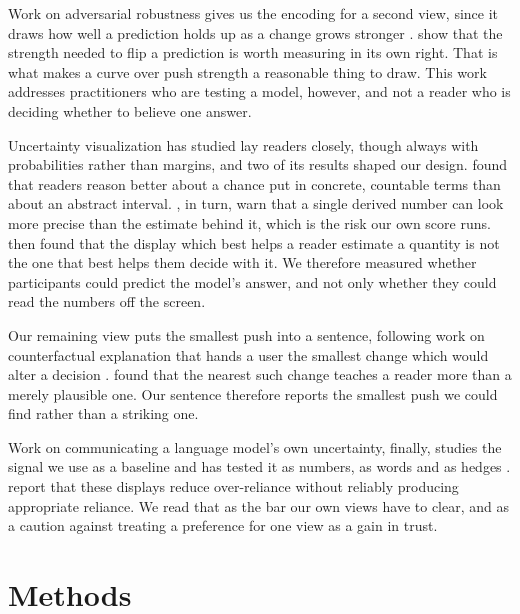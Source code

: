 \documentclass[sigconf]{acmart}
\begin{document}
Work on adversarial robustness gives us the encoding for a second view, since it draws how well a prediction
holds up as a change grows stronger \cite{dasBluffInteractivelyDeciphering2020, youPandaNotPanda2023,
liVisualAnalyticsNeuron2023}. \citet{stoehrActivationScalingSteering2024} show that the strength needed to
flip a prediction is worth measuring in its own right. That is what makes a curve over push strength a
reasonable thing to draw. This work addresses practitioners who are testing a model, however, and not a reader
who is deciding whether to believe one answer.

Uncertainty visualization has studied lay readers closely, though always with probabilities rather than
margins, and two of its results shaped our design. \citet{kayWhenIshMy2016} found that readers reason better
about a chance put in concrete, countable terms than about an abstract interval.
\citet{correllValueSuppressingUncertaintyPalettes2018}, in turn, warn that a single derived number can look
more precise than the estimate behind it, which is the risk our own score runs.
\citet{fernandesUncertaintyDisplaysUsing2018} then found that the display which best helps a reader estimate a
quantity is not the one that best helps them decide with it. We therefore measured whether participants could
predict the model's answer, and not only whether they could read the numbers off the screen.

Our remaining view puts the smallest push into a sentence, following work on counterfactual explanation that
hands a user the smallest change which would alter a decision \cite{chengDECEDecisionExplorer2020,
wangGAMCoachInteractive2023}. \citet{kuhlKeepYourFriends2022} found that the nearest such change teaches a
reader more than a merely plausible one. Our sentence therefore reports the smallest push we could find rather
than a striking one.

Work on communicating a language model's own uncertainty, finally, studies the signal we use as a baseline and
has tested it as numbers, as words and as hedges \cite{kimImNotSure2024, warrenWhenShouldTrust2026,
villavicencioNotAllUncertainty2026}. \citet{boRelyNotRely2024} report that these displays reduce over-reliance
without reliably producing appropriate reliance. We read that as the bar our own views have to clear, and as a
caution against treating a preference for one view as a gain in trust.

\section{Methods}
\end{document}
